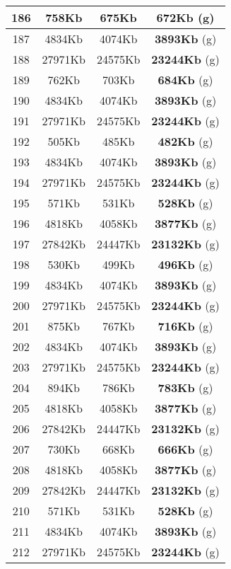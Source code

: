 \begin{table}[H]
\begin{minipage}{5cm}
{\begin{tabular}{|c|c|c|c|}
\hline
186 & 758Kb & 675Kb & \textbf{672Kb} (g) \\
\hline
187 & 4834Kb & 4074Kb & \textbf{3893Kb} (g) \\
\hline
188 & 27971Kb & 24575Kb & \textbf{23244Kb} (g) \\
\hline
189 & 762Kb & 703Kb & \textbf{684Kb} (g) \\
\hline
190 & 4834Kb & 4074Kb & \textbf{3893Kb} (g) \\
\hline
191 & 27971Kb & 24575Kb & \textbf{23244Kb} (g) \\
\hline
192 & 505Kb & 485Kb & \textbf{482Kb} (g) \\
\hline
193 & 4834Kb & 4074Kb & \textbf{3893Kb} (g) \\
\hline
194 & 27971Kb & 24575Kb & \textbf{23244Kb} (g) \\
\hline
195 & 571Kb & 531Kb & \textbf{528Kb} (g) \\
\hline
196 & 4818Kb & 4058Kb & \textbf{3877Kb} (g) \\
\hline
197 & 27842Kb & 24447Kb & \textbf{23132Kb} (g) \\
\hline
198 & 530Kb & 499Kb & \textbf{496Kb} (g) \\
\hline
199 & 4834Kb & 4074Kb & \textbf{3893Kb} (g) \\
\hline
200 & 27971Kb & 24575Kb & \textbf{23244Kb} (g) \\
\hline
201 & 875Kb & 767Kb & \textbf{716Kb} (g) \\
\hline
202 & 4834Kb & 4074Kb & \textbf{3893Kb} (g) \\
\hline
203 & 27971Kb & 24575Kb & \textbf{23244Kb} (g) \\
\hline
204 & 894Kb & 786Kb & \textbf{783Kb} (g) \\
\hline
205 & 4818Kb & 4058Kb & \textbf{3877Kb} (g) \\
\hline
206 & 27842Kb & 24447Kb & \textbf{23132Kb} (g) \\
\hline
207 & 730Kb & 668Kb & \textbf{666Kb} (g) \\
\hline
208 & 4818Kb & 4058Kb & \textbf{3877Kb} (g) \\
\hline
209 & 27842Kb & 24447Kb & \textbf{23132Kb} (g) \\
\hline
210 & 571Kb & 531Kb & \textbf{528Kb} (g) \\
\hline
211 & 4834Kb & 4074Kb & \textbf{3893Kb} (g) \\
\hline
212 & 27971Kb & 24575Kb & \textbf{23244Kb} (g) \\
\hline
\end{tabular}
}

\end{minipage}
\end{table}
